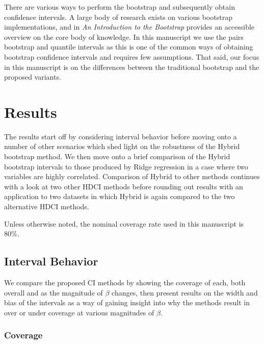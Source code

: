 
There are various ways to perform the bootstrap and subsequently obtain confidence intervals. A large body of research exists on various bootstrap implementations, and \cite{Efron1994} in \textit{An Introduction to the Bootstrap} provides an accessible overview on the core body of knowledge. In this manuscript we use the pairs bootstrap and quantile intervals as this is one of the common ways of obtaining bootstrap confidence intervals and requires few assumptions. That said, our focus in this manuscript is on the differences between the traditional bootstrap and the proposed variants.

\section{Results}

The results start off by considering interval behavior before moving onto a number of other scenarios which shed light on the robustness of the Hybrid bootstrap method. We then move onto a brief comparison of the Hybrid bootstrap intervals to those produced by Ridge regression in a case where two variables are highly correlated. Comparison of Hybrid to other methods continues with a look at two other HDCI methods before rounding out results with an application to two datasets in which Hybrid is again compared to the two alternative HDCI methods.

Unless otherwise noted, the nominal coverage rate used in this manuscript is 80\%.

\subsection{Interval Behavior}

We compare the proposed CI methods by showing the coverage of each, both overall and as the magnitude of $\beta$ changes, then present results on the width and bias of the intervals as a way of gaining insight into why the methods result in over or under coverage at various magnitudes of $\beta$.

\subsubsection{Coverage}\label{Sec:Coverage}

